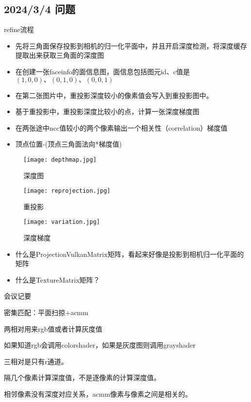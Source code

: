 \subsection{2024/3/4 问题}
refine流程
\begin{itemize}
	\item 先将三角面保存投影到相机的归一化平面中，并且开启深度检测，将深度缓存提取出来获取三角面的深度图
	\item 在创建一张faceinfo的面信息图，面信息包括图元id、c值是$(1,0,0)、(0,1,0)、(0,0,1)$
	\item 在第二张图片中，重投影深度较小的像素值会写入到重投影图中。
	\item 基于重投影中，重投影深度比较小的点，计算一张深度梯度图
	\item 在两张途中ncc值较小的两个像素输出一个相关性（correlation）梯度值
	\item 顶点位置-(顶点三角面法向*梯度值)
\end{itemize}

\begin{figure}[h]
    \centering
    \texttt{[image: depthmap.jpg]}
    \caption{深度图}
\end{figure}

\begin{figure}[h]
    \centering
    \texttt{[image: reprojection.jpg]}
    \caption{重投影}
\end{figure}

\begin{figure}[h]
    \centering
    \texttt{[image: variation.jpg]}
    \caption{深度梯度}
\end{figure}

\begin{itemize}
	\item 什么是ProjectionVulkanMatrix矩阵，看起来好像是投影到相机归一化平面的矩阵
	\item 什么是TextureMatrix矩阵？
\end{itemize}

会议记要

密集匹配：平面扫掠+acmm

两相对用来rgb值或者计算灰度值

如果知道rgb会调用colorshader，如果是灰度图则调用grayshader

三相对是只有r通道。

隔几个像素计算深度值，不是逐像素的计算深度值。

相邻像素没有深度对应关系，acmm像素与像素之间是相关的。

